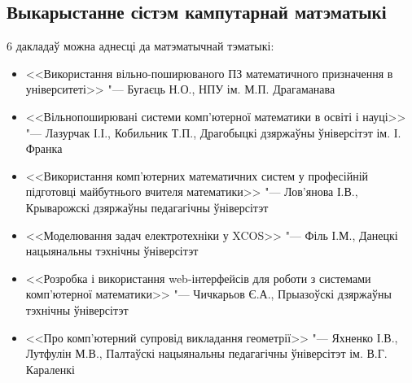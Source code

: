 \documentclass[10pt, a5paper]{article}
\begin{document}
\subsection*{Выкарыстанне сістэм кампутарнай матэматыкі}
6 дакладаў можна аднесці да матэматычнай тэматыкі:
\begin{itemize}
\item <<Використання вільно-поширюваного ПЗ математичного призначення в університеті>> "--- Бугаєць Н.О., НПУ ім. М.П. Драгаманава
\item <<Вільнопоширювані системи комп'ютерної математики в осві\-ті і науці>> "--- Лазурчак І.І., Кобильник Т.П., Драгобыцкі дзяржаўны ўніверсітэт ім. І. Франка
\item <<Використання комп'ютерних математичних систем у про\-фе\-сій\-ній підготовці майбутнього вчителя математики>> "--- Лов'я\-но\-ва І.В., Крыварожскі дзяржаўны педагагічны ўніверсітэт
\item <<Моделювання задач електротехніки у XCOS>> "--- Філь І.М., Данецкі нацыянальны тэхнічны ўніверсітэт
\item <<Розробка і використання web-інтерфейсів для роботи з системами комп'ютерної математики>> "--- Чичкарьов Є.А., Прыазоўскі дзяржаўны тэхнічны ўніверсітэт
\item <<Про комп'ютерний супровід викладання геометрії>> "--- Яхненко І.В., Лутфулін М.В., Палтаўскі нацыянальны педагагічны ўніверсітэт ім. В.Г. Караленкі
\end{itemize}
\end{document}
